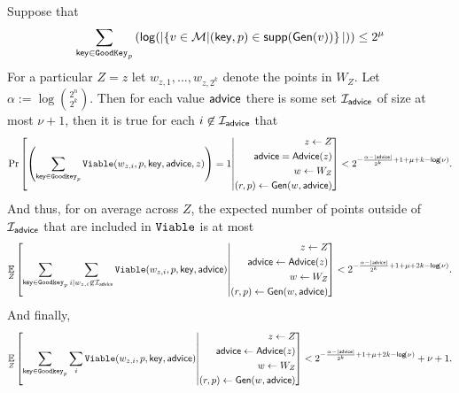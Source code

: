 \begin{corollary}
\label{corollary:info loss}
Suppose that 
\[
   \sum_{\mathsf{key}\in \mathtt{GoodKey}_p} \left( \mathsf{log}\!\left(|\!\left\{ v \in \mathcal{M}|\!\left(\mathsf{key}, p\right) \in \mathsf{supp}\!\left(\mathsf{Gen}(v)\right) \right\}|\right)\right) \le 2^\mu 
 \]
 For a particular $Z=z$ let $w_{z,1},..., w_{z,2^k}$ denote the points in $W_Z$. Let $\alpha:= \log {2^n\choose 2^k}$.  
 Then for each value ${\mathsf{advice}}$ there is some set $\mathcal{I}_{{\mathsf{advice}}}$ of size at most $\nu+1$, then it is true for each $i\not \in \mathcal{I}_{\mathsf{advice}}$ that
\[
\Pr\left[\left(\sum_{\mathsf{key} \in \mathtt{Goodkey}_p} \mathtt{Viable}(w_{z,i}, p, \mathsf{key}, {\mathsf{advice}}, z)\right) = 1\middle| \begin{aligned} z\leftarrow Z\\ {\mathsf{advice}}= {\mathsf{Advice}}(z)\\w\leftarrow W_Z\\(r, p)\leftarrow {\ensuremath{\mathsf{Gen}}}(w, {\mathsf{advice}}) \end{aligned} \right]< 2^{-\frac{\alpha-|{\mathsf{advice}}|}{2^k}+1+\mu+k-\mathsf{log}\!\left(\nu\right) }.
\]
And thus, for on average across $Z$, the expected number of points outside of $\mathcal{I}_{\mathsf{advice}}$ that are included in $\mathtt{Viable}$ is at most 
\begin{align*}
\operatorname*{\mathbb{E}}_{Z} \left[\sum_{\mathsf{key} \in \mathtt{Goodkey}_p}\sum_{i | w_{z,i}\not\in\mathcal{I}_{\mathsf{advice}}} \mathtt{Viable}(w_{z,i}, p, \mathsf{key}, {\mathsf{advice}}) \middle| \begin{aligned} z\leftarrow Z\\ {\mathsf{advice}}\leftarrow {\ensuremath{\mathsf{Advice}}}(z)\\w\leftarrow W_Z\\(r, p)\leftarrow {\ensuremath{\mathsf{Gen}}}(w, {\mathsf{advice}})\end{aligned} \right]< 2^{-\frac{\alpha - |{\mathsf{advice}}|}{2^k}+1+\mu+2k-\mathsf{log}\!\left(\nu\right)}.
\end{align*}
And finally, 
\begin{align*}
\operatorname*{\mathbb{E}}_{Z} \left[\sum_{\mathsf{key} \in \mathtt{Goodkey}_p}\sum_{i }  \mathtt{Viable}(w_{z,i}, p, \mathsf{key}, {\mathsf{advice}}) \middle| \begin{aligned} z\leftarrow Z\\ {\mathsf{advice}}\leftarrow {\ensuremath{\mathsf{Advice}}}(z)\\w\leftarrow W_Z\\(r, p)\leftarrow {\ensuremath{\mathsf{Gen}}}(w, {\mathsf{advice}})\end{aligned} \right]< 2^{-\frac{\alpha-|{\mathsf{advice}}|}{2^k}+1+\mu+2k-\mathsf{log}\!\left(\nu\right)}+\nu+1.
\end{align*}

\end{corollary}

